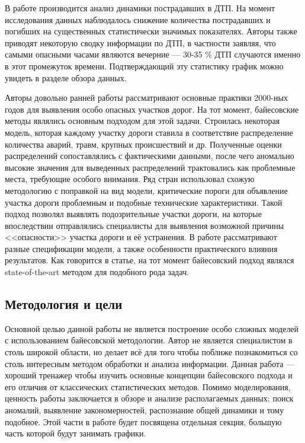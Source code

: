 \documentclass[a4paper, 14pt]{article}
\begin{document}
В работе \cite{konyuhov2015analysis} производится анализ динамики пострадавших в ДТП. На момент исследования данных наблюдалось снижение количества пострадавших и погибших на существенных статистически значимых показателях. Авторы также приводят некоторую сводку информации по ДТП, в частности заявляя, что самыми опасными часами являются вечерние --- 30-35 \% ДТП случаются именно в этот промежуток времени. Подтверждающий эту статистику график можно увидеть в разделе обзора данных. 

Авторы довольно ранней работы \cite{elvik2007state} рассматривают основные практики 2000-ных годов для выявления особо опасных участков дорог. На тот момент, байесовские методы являлись основным подходом для этой задачи. Строилась некоторая модель, которая каждому участку дороги ставила в соответствие распределение количества аварий, травм, крупных происшествий и др. Полученные оценки распределений сопоставлялись с фактическими данными, после чего аномально высокие значения для выведенных распределений трактовались как проблемные места, требующие особого внимания. Ряд стран использовал схожую методологию с поправкой на вид модели, критические пороги для объявление участка дороги проблемным и подобные технические характеристики. Такой подход позволял выявлять подозрительные участки дороги, на которые впоследствии отправлялись специалисты для выявления возможной причины <<опасности>> участка дороги и её устранения. В работе рассматривают разные спецификации модели, а также особенности практического влияния результатов. Как говорится в статье, на тот момент байесовский подход являлся state-of-the-art методом для подобного рода задач.


\subsection{Методология и цели}
Основной целью данной работы не является построение особо сложных моделей с использованием байесовской методологии. Автор не является специалистом в столь широкой области, но делает всё для того чтобы поближе познакомиться со столь интересным методом обработки и анализа информации. Данная работа --- хороший тренажер чтобы изучить основные концепции байесовского подхода и его отличия от классических статистических методов. Помимо моделирования, ценность работы заключается в обзоре и анализе располагаемых данных: поиск аномалий, выявление закономерностей, распознание общей динамики и тому подобное. Этой части в работе будет посвящена отдельная секция, большую часть которой будут занимать графики.
\end{document}
